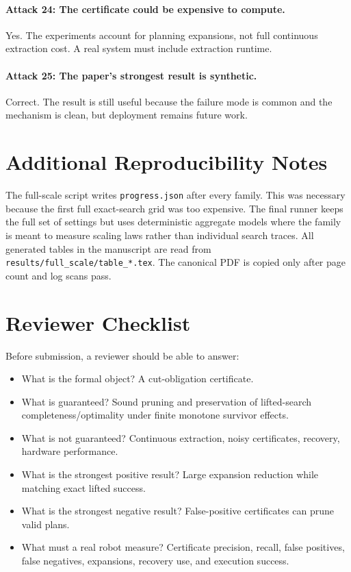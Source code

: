 \documentclass{article}
\begin{document}
\paragraph{Attack 24: The certificate could be expensive to compute.}
Yes. The experiments account for planning expansions, not full continuous extraction cost. A real system must include extraction runtime.

\paragraph{Attack 25: The paper's strongest result is synthetic.}
Correct. The result is still useful because the failure mode is common and the mechanism is clean, but deployment remains future work.

\section{Additional Reproducibility Notes}

The full-scale script writes \texttt{progress.json} after every family. This was necessary because the first full exact-search grid was too expensive. The final runner keeps the full set of settings but uses deterministic aggregate models where the family is meant to measure scaling laws rather than individual search traces. All generated tables in the manuscript are read from \texttt{results/full\_scale/table\_*.tex}. The canonical PDF is copied only after page count and log scans pass.

\section{Reviewer Checklist}

Before submission, a reviewer should be able to answer:
\begin{itemize}
  \item What is the formal object? A cut-obligation certificate.
  \item What is guaranteed? Sound pruning and preservation of lifted-search completeness/optimality under finite monotone survivor effects.
  \item What is not guaranteed? Continuous extraction, noisy certificates, recovery, hardware performance.
  \item What is the strongest positive result? Large expansion reduction while matching exact lifted success.
  \item What is the strongest negative result? False-positive certificates can prune valid plans.
  \item What must a real robot measure? Certificate precision, recall, false positives, false negatives, expansions, recovery use, and execution success.
\end{itemize}
\end{document}
